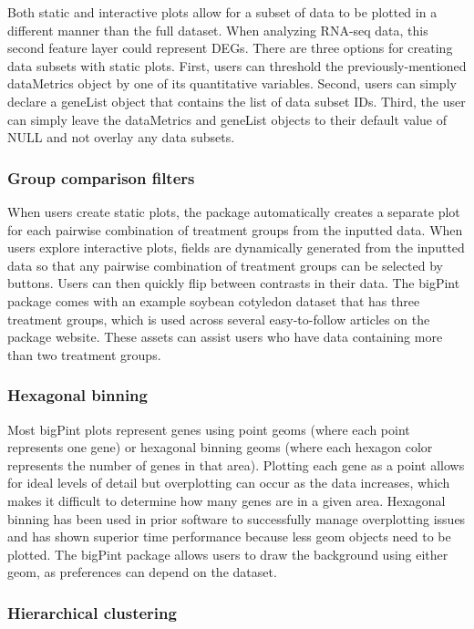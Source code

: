 \documentclass[parskip=full]{bmcart} %
\begin{document}
Both static and interactive plots allow for a subset of data to be plotted in a different manner than the full dataset. When analyzing RNA-seq data, this second feature layer could represent DEGs. There are three options for creating data subsets with static plots. First, users can threshold the previously-mentioned dataMetrics object by one of its quantitative variables. Second, users can simply declare a geneList object that contains the list of data subset IDs. Third, the user can simply leave the dataMetrics and geneList objects to their default value of NULL and not overlay any data subsets.

\subsubsection*{Group comparison filters}

When users create static plots, the package automatically creates a separate plot for each pairwise combination of treatment groups from the inputted data. When users explore interactive plots, fields are dynamically generated from the inputted data so that any pairwise combination of treatment groups can be selected by buttons. Users can then quickly flip between contrasts in their data. The bigPint package comes with an example soybean cotyledon dataset that has three treatment groups, which is used across several easy-to-follow articles on the package website. These assets can assist users who have data containing more than two treatment groups. 

\subsubsection*{Hexagonal binning}

Most bigPint plots represent genes using point geoms (where each point represents one gene) or hexagonal binning geoms (where each hexagon color represents the number of genes in that area). Plotting each gene as a point allows for ideal levels of detail but overplotting can occur as the data increases, which makes it difficult to determine how many genes are in a given area. Hexagonal binning has been used in prior software to successfully manage overplotting issues \cite{carr1987scatterplot, harshbarger2017deiva} and has shown superior time performance because less geom objects need to be plotted. The bigPint package allows users to draw the background using either geom, as preferences can depend on the dataset.

\subsubsection*{Hierarchical clustering}
\end{document}
